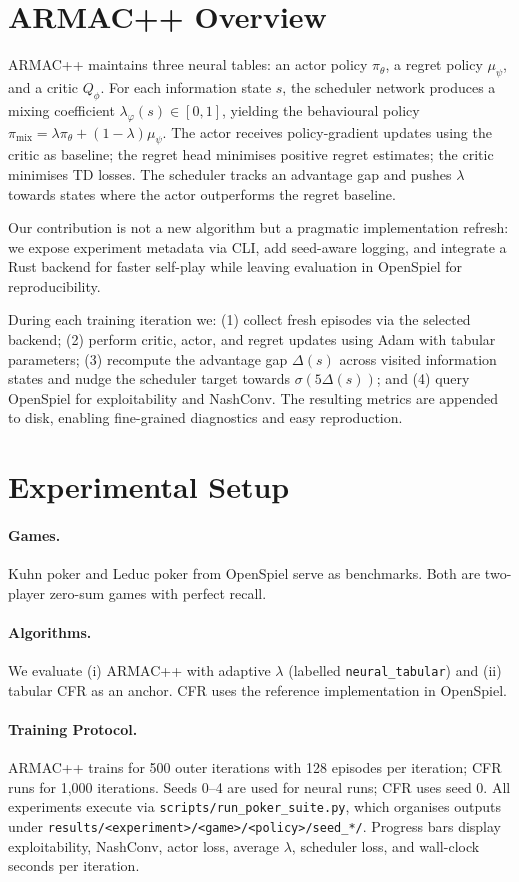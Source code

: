 \documentclass[11pt]{article}
\begin{document}
\section{ARMAC++ Overview}
ARMAC++ maintains three neural tables: an actor policy $\pi_\theta$, a regret policy $\mu_\psi$, and a critic $Q_\phi$. For each information state $s$, the scheduler network produces a mixing coefficient $\lambda_\varphi(s) \in [0,1]$, yielding the behavioural policy $\pi_{\mathrm{mix}} = \lambda \pi_\theta + (1-\lambda)\mu_\psi$. The actor receives policy-gradient updates using the critic as baseline; the regret head minimises positive regret estimates; the critic minimises TD losses. The scheduler tracks an advantage gap and pushes $\lambda$ towards states where the actor outperforms the regret baseline.

Our contribution is not a new algorithm but a pragmatic implementation refresh: we expose experiment metadata via CLI, add seed-aware logging, and integrate a Rust backend for faster self-play while leaving evaluation in OpenSpiel for reproducibility.

During each training iteration we: (1) collect fresh episodes via the selected backend; (2) perform critic, actor, and regret updates using Adam with tabular parameters; (3) recompute the advantage gap $\Delta(s)$ across visited information states and nudge the scheduler target towards $\sigma(5\Delta(s))$; and (4) query OpenSpiel for exploitability and NashConv. The resulting metrics are appended to disk, enabling fine-grained diagnostics and easy reproduction.

\section{Experimental Setup}
\paragraph{Games.} Kuhn poker and Leduc poker from OpenSpiel serve as benchmarks. Both are two-player zero-sum games with perfect recall.

\paragraph{Algorithms.} We evaluate (i) ARMAC++ with adaptive $\lambda$ (labelled \texttt{neural\_tabular}) and (ii) tabular CFR as an anchor. CFR uses the reference implementation in OpenSpiel.

\paragraph{Training Protocol.} ARMAC++ trains for 500 outer iterations with 128 episodes per iteration; CFR runs for 1{,}000 iterations. Seeds 0--4 are used for neural runs; CFR uses seed 0. All experiments execute via \texttt{scripts/run\_poker\_suite.py}, which organises outputs under
\texttt{results/\textless experiment\textgreater/\textless game\textgreater/\textless policy\textgreater/seed\_*/}. Progress bars display exploitability, NashConv, actor loss, average $\lambda$, scheduler loss, and wall-clock seconds per iteration.
\end{document}
